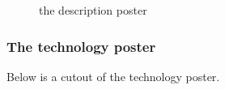 \begin{figure}[!h]
  \centering
  \caption{the description poster}
  \label{fig:poster_describing}
\end{figure}

\pagebreak

\subsubsection{The technology poster}

Below is a cutout of the technology poster.

